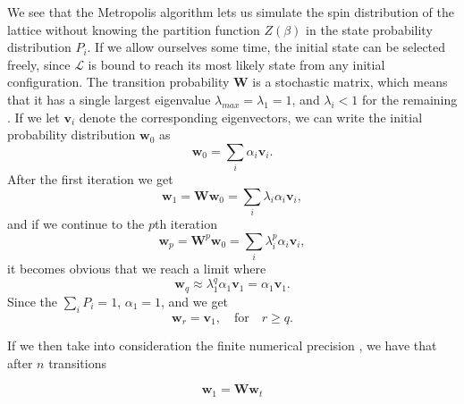 \documentclass[]{article}
\begin{document}
We see that the Metropolis algorithm lets us simulate the spin distribution of the lattice without knowing the partition function $Z(\beta)$ in the state probability distribution $P_i$. If we allow ourselves some time, the initial state can be selected freely, since $\mathcal{L}$ is bound to reach its most likely state from any initial configuration. The transition probability $\mathbf{W}$ is a stochastic matrix, which means that it has a single largest eigenvalue $\lambda_{max} = \lambda_1 = 1$, and $\lambda_i < 1$ for the remaining \cite{fys-stk4155-notes}. If we let $\mathbf{v}_i$ denote the corresponding eigenvectors, we can write the initial probability distribution $\mathbf{w}_{0}$ as
\begin{equation}
	\mathbf{w}_{0} = \sum_{i} \alpha_i \mathbf{v}_i.
\end{equation}
After the first iteration we get
\begin{equation}
	\mathbf{w}_{1} = \mathbf{W} \mathbf{w}_{0} = \sum_{i} \lambda_i \alpha_i \mathbf{v}_i,
\end{equation}
and if we continue to the $p$th iteration
\begin{equation}
	\mathbf{w}_{p} = \mathbf{W}^p \mathbf{w}_{0} = \sum_{i} \lambda_i^p \alpha_i \mathbf{v}_i,
\end{equation}
it becomes obvious that we reach a limit where
\begin{equation}
	\mathbf{w}_{q} \approx \lambda_1^q \alpha_1 \mathbf{v}_1 = \alpha_1 \mathbf{v}_1.
\end{equation}
Since the $\sum_{i} P_i = 1$, $\alpha_1 = 1$, and we get
\begin{equation}
	\mathbf{w}_{r} = \mathbf{v}_1, \quad \text{for} \quad r \ge q.
\end{equation}

If we then take into consideration the finite numerical precision 
, we have that after $n$ transitions


\begin{equation}
	\mathbf{w}_{1} = \mathbf{W} \mathbf{w}_{t}
\end{equation}



\end{document}
